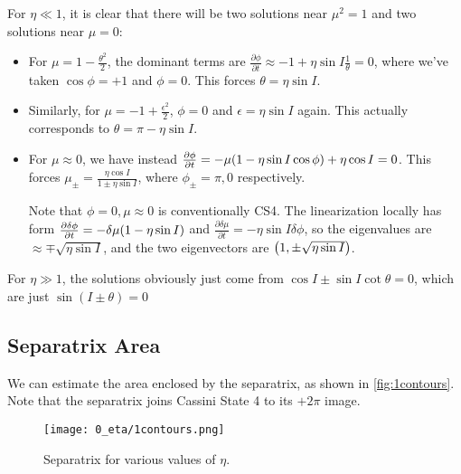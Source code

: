 \documentclass[11pt,
        usenames, %
        dvipsnames %
    ]{article}
\newcommand*{\pd}[2]{\frac{\partial#1}{\partial#2}}
\DeclarePairedDelimiter\p{\lparen}{\rparen}
\begin{document}
For $\eta \ll 1$, it is clear that there will be two solutions near $\mu^2 = 1$
and two solutions near $\mu = 0$:
\begin{itemize}
    \item For $\mu = 1 - \frac{\theta^2}{2}$, the dominant terms are
        $\pd{\phi}{t} \approx -1 + \eta \sin I \frac{1}{\theta} = 0$,
        where we've taken $\cos \phi = +1$ and $\phi = 0$. This forces $\theta
        = \eta \sin I$.

    \item Similarly, for $\mu = -1 + \frac{\epsilon^2}{2}$, $\phi = 0$ and
        $\epsilon = \eta \sin I$ again. This actually corresponds to $\theta =
        \pi - \eta \sin I$.

    \item For $\mu \approx 0$, we have instead $\pd{\phi}{t} = -\mu\p*{1 - \eta
        \sin I \cos \phi} + \eta \cos I = 0$. This forces $\mu_\pm = \frac{\eta
        \cos I}{1 \pm \eta \sin I}$, where $\phi_{\pm} = \pi, 0$ respectively.

        Note that $\phi = 0, \mu \approx 0$ is conventionally CS4. The
        linearization locally has form $\pd{\delta \phi}{t} = -\delta \mu\p*{1 -
        \eta \sin I}$ and $\pd{\delta \mu}{t} = -\eta \sin I \delta \phi$, so
        the eigenvalues are $\approx \mp \sqrt{\eta \sin I}$, and the two
        eigenvectors are $\p*{1, \pm \sqrt{\eta \sin I}}$.
\end{itemize}

For $\eta \gg 1$, the solutions obviously just come from $\cos I \pm \sin I \cot
\theta = 0$, which are just $\sin (I \pm \theta) = 0$

\subsection{Separatrix Area}\label{ss:sep_area}

We can estimate the area enclosed by the separatrix, as shown in
\autoref{fig:1contours}. Note that the separatrix joins Cassini State 4 to its
$+ 2\pi$ image.
\begin{figure}[t]
    \centering
    \texttt{[image: 0\_eta/1contours.png]}
    \caption{Separatrix for various values of $\eta$.}\label{fig:1contours}
\end{figure}
\end{document}
